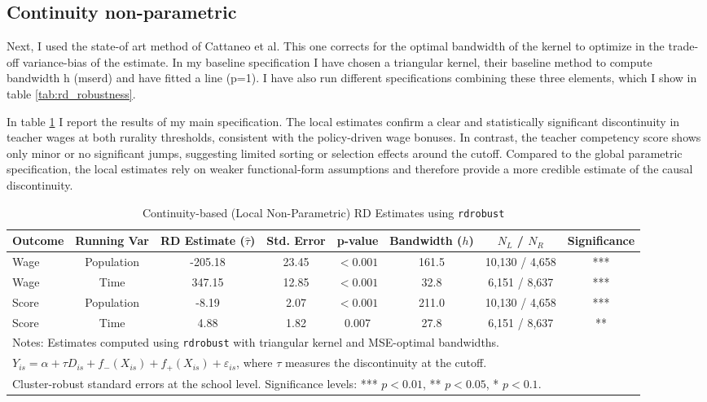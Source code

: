 \documentclass{article}
\begin{document}
\subsection{Continuity non-parametric}

Next, I used the state-of art method of Cattaneo et al. This one corrects for the optimal bandwidth of the kernel to optimize in the trade-off variance-bias of the estimate. In my baseline specification I have chosen a triangular kernel, their baseline method to compute bandwidth h (mserd) and have fitted a line (p=1). I have also run different specifications combining these three elements, which I show in table \ref{tab:rd_robustness}. 

In table \ref{tab:local_rd} I report the results of my main specification. The local estimates confirm a clear and statistically significant discontinuity in teacher wages at both rurality thresholds, consistent with the policy-driven wage bonuses. In contrast, the teacher competency score shows only minor or no significant jumps, suggesting limited sorting or selection effects around the cutoff. Compared to the global parametric specification, the local estimates rely on weaker functional-form assumptions and therefore provide a more credible estimate of the causal discontinuity.

\begin{table}[H]
\centering
\caption{Continuity-based (Local Non-Parametric) RD Estimates using \texttt{rdrobust}}
\label{tab:local_rd}
\begin{tabular}{lccccccc}
\hline
Outcome & Running Var & RD Estimate ($\hat{\tau}$) & Std. Error & p-value & Bandwidth ($h$) & $N_L$ / $N_R$ & Significance \\
\hline
Wage   & Population & -205.18 & 23.45 & $<0.001$ & 161.5 & 10,130 / 4,658 & *** \\
Wage   & Time       & 347.15  & 12.85 & $<0.001$ & 32.8  & 6,151 / 8,637  & *** \\
Score  & Population & -8.19   & 2.07  & $<0.001$ & 211.0 & 10,130 / 4,658 & *** \\
Score  & Time       & 4.88    & 1.82  & 0.007 & 27.8 & 6,151 / 8,637 & ** \\
\hline
\multicolumn{8}{l}{\footnotesize Notes: Estimates computed using \texttt{rdrobust} with triangular kernel and MSE-optimal bandwidths.}\\
\multicolumn{8}{l}{\footnotesize $Y_{is} = \alpha + \tau D_{is} + f_-(X_{is}) + f_+(X_{is}) + \varepsilon_{is}$, where $\tau$ measures the discontinuity at the cutoff.}\\
\multicolumn{8}{l}{\footnotesize Cluster-robust standard errors at the school level. Significance levels: *** $p<0.01$, ** $p<0.05$, * $p<0.1$.}\\
\end{tabular}
\end{table}
\end{document}
